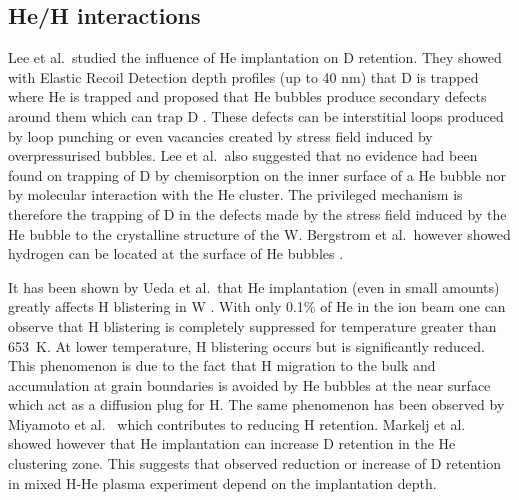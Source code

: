 

\subsection{He/H interactions}
Lee et al.\ studied the influence of \gls{He} implantation on \gls{D} \gls{retention}.
They showed with Elastic Recoil Detection depth profiles (up to 40 nm) that \gls{D} is trapped where \gls{He} is trapped and proposed that \gls{He} bubbles produce secondary defects around them which can trap \gls{D} .
These defects can be interstitial loops produced by \gls{loop punching} or even vacancies created by stress field induced by overpressurised bubbles.
Lee et al.\ also suggested that no evidence had been found on trapping of \gls{D} by chemisorption on the inner surface of a \gls{He} bubble nor by molecular interaction with the \gls{He} cluster.
The privileged mechanism is therefore the trapping of \gls{D} in the defects made by the stress field induced by the \gls{He} bubble to the crystalline structure of the W.
Bergstrom et al.\ however showed hydrogen can be located at the surface of \gls{He} bubbles .

It has been shown by Ueda et al.\ that \gls{He} implantation (even in small amounts) greatly affects \gls{H} blistering in \gls{W} .
With only 0.1\% of \gls{He} in the ion beam one can observe that \gls{H} blistering is completely suppressed for temperature greater than \SI{653}{K}.
At lower temperature, \gls{H} blistering occurs but is significantly reduced.
This phenomenon is due to the fact that \gls{H} migration to the bulk and accumulation at grain boundaries is avoided by \gls{He} bubbles at the near surface which act as a diffusion plug for H.
The same phenomenon has been observed by Miyamoto et al.\  which contributes to reducing \gls{H} \gls{retention}.
Markelj et al.\  showed however that \gls{He} implantation can increase \gls{D} \gls{retention} in the \gls{He} clustering zone.
This suggests that observed reduction or increase of \gls{D} \gls{retention} in mixed H-He \gls{plasma} experiment depend on the implantation depth.

